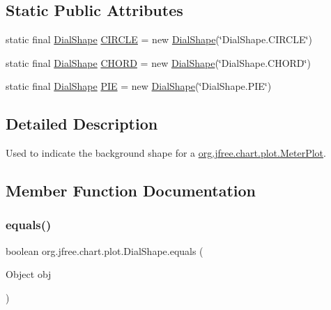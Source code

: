 \subsection*{Static Public Attributes}
\begin{DoxyCompactItemize}
\item 
static final \mbox{\hyperlink{classorg_1_1jfree_1_1chart_1_1plot_1_1_dial_shape}{Dial\+Shape}} \mbox{\hyperlink{classorg_1_1jfree_1_1chart_1_1plot_1_1_dial_shape_af7940604b87aac7098000a04700deb0f}{C\+I\+R\+C\+LE}} = new \mbox{\hyperlink{classorg_1_1jfree_1_1chart_1_1plot_1_1_dial_shape}{Dial\+Shape}}(\char`\"{}Dial\+Shape.\+C\+I\+R\+C\+LE\char`\"{})
\item 
static final \mbox{\hyperlink{classorg_1_1jfree_1_1chart_1_1plot_1_1_dial_shape}{Dial\+Shape}} \mbox{\hyperlink{classorg_1_1jfree_1_1chart_1_1plot_1_1_dial_shape_ad8f4bfdfec90665e47630eef64deed9c}{C\+H\+O\+RD}} = new \mbox{\hyperlink{classorg_1_1jfree_1_1chart_1_1plot_1_1_dial_shape}{Dial\+Shape}}(\char`\"{}Dial\+Shape.\+C\+H\+O\+RD\char`\"{})
\item 
static final \mbox{\hyperlink{classorg_1_1jfree_1_1chart_1_1plot_1_1_dial_shape}{Dial\+Shape}} \mbox{\hyperlink{classorg_1_1jfree_1_1chart_1_1plot_1_1_dial_shape_aba31524b7ffeb470c6ea959878b3b950}{P\+IE}} = new \mbox{\hyperlink{classorg_1_1jfree_1_1chart_1_1plot_1_1_dial_shape}{Dial\+Shape}}(\char`\"{}Dial\+Shape.\+P\+IE\char`\"{})
\end{DoxyCompactItemize}


\subsection{Detailed Description}
Used to indicate the background shape for a \mbox{\hyperlink{classorg_1_1jfree_1_1chart_1_1plot_1_1_meter_plot}{org.\+jfree.\+chart.\+plot.\+Meter\+Plot}}. 

\subsection{Member Function Documentation}
\mbox{\label{classorg_1_1jfree_1_1chart_1_1plot_1_1_dial_shape_a04392abff5278a3b98a4fa653501a6e0}} 
\subsubsection{\texorpdfstring{equals()}{equals()}}
{\footnotesize\ttfamily boolean org.\+jfree.\+chart.\+plot.\+Dial\+Shape.\+equals (\begin{DoxyParamCaption}\item[{Object}]{obj }\end{DoxyParamCaption})}

